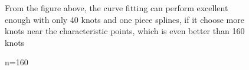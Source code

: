 \documentclass{article}
\begin{document}
\begin{figure}[h]
{    }
    \caption{n=160}    
    From the figure above, the curve fitting can perform excellent enough with only 40 knots and one piece splines, if it choose more knots near the characteristic points, which is even better than 160 knots 
\end{figure}

\end{document}
